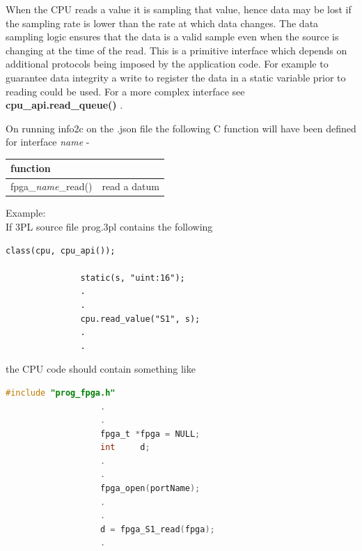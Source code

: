             When the CPU reads a value it is sampling that value, hence data may
            be lost if the sampling rate is lower than the rate at which data
            changes. The data sampling logic ensures that the data is a valid
            sample even when the source is changing at the time of the
            read. This is a primitive interface which depends on additional
            protocols being imposed by the application code. For example to
            guarantee data integrity a write to register the data in a static
            variable prior to reading could be used. For a more complex interface see {\bf cpu\_api.read\_queue()}
            .
            
            On running info2c on the .json file the following C function will have been
            defined for interface {\em name} -
            
            \begin{tabular}{| l | l |}
            \hline
            function                   &                 \\ \hline \hline
            fpga\_{\em name}\_read()   & read a datum    \\ \hline
            \end{tabular}
            
            Example: \\
            If 3PL source file prog.3pl contains the following \\
            \begin{lstlisting}[gobble=12, language=threepl]
               class(cpu, cpu_api());
               
               static(s, "uint:16");
               .
               .
               cpu.read_value("S1", s);
               .
               .
            \end{lstlisting}
            the CPU code should contain something like \\
            \begin{lstlisting}[gobble=12, language=C]
                   #include "prog_fpga.h"
                   .
                   .
                   fpga_t *fpga = NULL;
                   int     d;
                   .
                   .
                   fpga_open(portName);
                   .
                   .
                   d = fpga_S1_read(fpga);
                   .
            \end{lstlisting}
            
